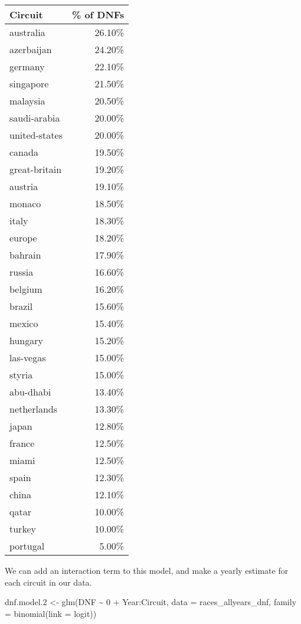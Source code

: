 \documentclass[
]{book}
\newenvironment{Shaded}{\begin{snugshade}}{\end{snugshade}}
\newcommand{\AttributeTok}[1]{\textcolor[rgb]{0.77,0.63,0.00}{#1}}
\newcommand{\DecValTok}[1]{\textcolor[rgb]{0.00,0.00,0.81}{#1}}
\newcommand{\FloatTok}[1]{\textcolor[rgb]{0.00,0.00,0.81}{#1}}
\newcommand{\FunctionTok}[1]{\textcolor[rgb]{0.00,0.00,0.00}{#1}}
\newcommand{\NormalTok}[1]{#1}
\newcommand{\OtherTok}[1]{\textcolor[rgb]{0.56,0.35,0.01}{#1}}
\newcommand{\SpecialCharTok}[1]{\textcolor[rgb]{0.00,0.00,0.00}{#1}}
\newcommand{\StringTok}[1]{\textcolor[rgb]{0.31,0.60,0.02}{#1}}
\begin{document}
\begin{longtable}{lr}
\toprule
Circuit & \% of DNFs \\ 
\midrule
australia & 26.10\% \\ 
azerbaijan & 24.20\% \\ 
germany & 22.10\% \\ 
singapore & 21.50\% \\ 
malaysia & 20.50\% \\ 
saudi-arabia & 20.00\% \\ 
united-states & 20.00\% \\ 
canada & 19.50\% \\ 
great-britain & 19.20\% \\ 
austria & 19.10\% \\ 
monaco & 18.50\% \\ 
italy & 18.30\% \\ 
europe & 18.20\% \\ 
bahrain & 17.90\% \\ 
russia & 16.60\% \\ 
belgium & 16.20\% \\ 
brazil & 15.60\% \\ 
mexico & 15.40\% \\ 
hungary & 15.20\% \\ 
las-vegas & 15.00\% \\ 
styria & 15.00\% \\ 
abu-dhabi & 13.40\% \\ 
netherlands & 13.30\% \\ 
japan & 12.80\% \\ 
france & 12.50\% \\ 
miami & 12.50\% \\ 
spain & 12.30\% \\ 
china & 12.10\% \\ 
qatar & 10.00\% \\ 
turkey & 10.00\% \\ 
portugal & 5.00\% \\ 
\bottomrule
\end{longtable}

We can add an interaction term to this model, and make a yearly estimate for each circuit in our data.

\begin{Shaded}
\begin{Highlighting}[]
\NormalTok{dnf.model}\FloatTok{.2} \OtherTok{\textless{}{-}} \FunctionTok{glm}\NormalTok{(DNF }\SpecialCharTok{\textasciitilde{}} \DecValTok{0} \SpecialCharTok{+}\NormalTok{ Year}\SpecialCharTok{:}\NormalTok{Circuit, }\AttributeTok{data =}\NormalTok{ races\_allyears\_dnf,}
                   \AttributeTok{family =} \FunctionTok{binomial}\NormalTok{(}\AttributeTok{link =} \StringTok{\textquotesingle{}logit\textquotesingle{}}\NormalTok{))}
\end{Highlighting}
\end{Shaded}
\end{document}
